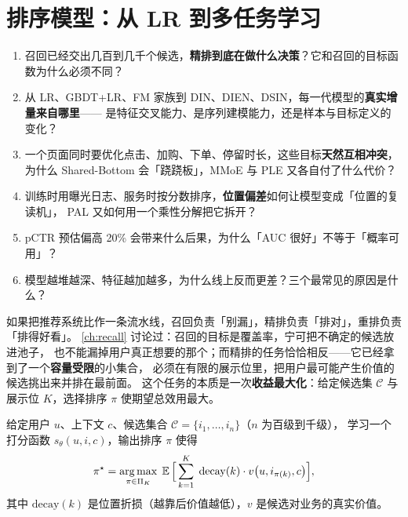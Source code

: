 \chapter{排序模型：从 LR 到多任务学习}
\label{ch:ranking}

\begin{insight}[本章要解决的问题]
\begin{enumerate}
  \item 召回已经交出几百到几千个候选，\textbf{精排到底在做什么决策}？它和召回的目标函数为什么必须不同？
  \item 从 LR、GBDT+LR、FM 家族到 DIN、DIEN、DSIN，每一代模型的\textbf{真实增量来自哪里}——
        是特征交叉能力、是序列建模能力，还是样本与目标定义的变化？
  \item 一个页面同时要优化点击、加购、下单、停留时长，这些目标\textbf{天然互相冲突}，
        为什么 Shared-Bottom 会「跷跷板」，MMoE 与 PLE 又各自付了什么代价？
  \item 训练时用曝光日志、服务时按分数排序，\textbf{位置偏差}如何让模型变成「位置的复读机」，
        PAL 又如何用一个乘性分解把它拆开？
  \item pCTR 预估偏高 20\% 会带来什么后果，为什么「AUC 很好」不等于「概率可用」？
  \item 模型越堆越深、特征越加越多，为什么线上反而更差？三个最常见的原因是什么？
\end{enumerate}
\end{insight}

如果把推荐系统比作一条流水线，召回负责「别漏」，精排负责「排对」，重排负责「排得好看」。
\cref{ch:recall} 讨论过：召回的目标是覆盖率，宁可把不确定的候选放进池子，
也不能漏掉用户真正想要的那个；而精排的任务恰恰相反——它已经拿到了一个\textbf{容量受限}的小集合，
必须在有限的展示位里，把用户最可能产生价值的候选挑出来并排在最前面。
这个任务的本质是一次\textbf{收益最大化}：给定候选集 $\mathcal{C}$ 与展示位 $K$，选择排序 $\pi$ 使期望总效用最大。

\begin{definition}[精排问题]
给定用户 $u$、上下文 $c$、候选集合 $\mathcal{C} = \{i_1, \dots, i_n\}$（$n$ 为百级到千级），
学习一个打分函数 $s_\theta(u, i, c)$，输出排序 $\pi$ 使得
\begin{equation}
\pi^\star = \operatorname*{arg\,max}_{\pi \in \Pi_K} \; \operatorname{\mathbb{E}}\Big[ \sum_{k=1}^{K} \; \mathrm{decay}(k) \cdot v\big(u, i_{\pi(k)}, c\big) \Big],
\label{eq:ranking-objective}
\end{equation}
其中 $\mathrm{decay}(k)$ 是位置折损（越靠后价值越低），$v$ 是候选对业务的真实价值。
\end{definition}

